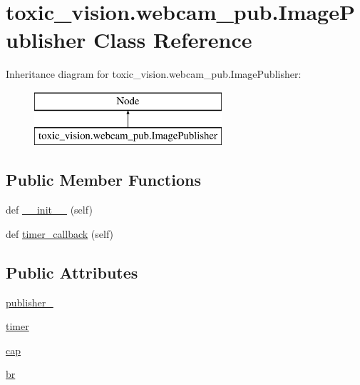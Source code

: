 \hypertarget{classtoxic__vision_1_1webcam__pub_1_1ImagePublisher}{}\section{toxic\+\_\+vision.\+webcam\+\_\+pub.\+Image\+Publisher Class Reference}
\label{classtoxic__vision_1_1webcam__pub_1_1ImagePublisher}
Inheritance diagram for toxic\+\_\+vision.\+webcam\+\_\+pub.\+Image\+Publisher\+:\begin{figure}[H]
\begin{center}
\leavevmode
\includegraphics[height=2.000000cm]{d2/da6/classtoxic__vision_1_1webcam__pub_1_1ImagePublisher}
\end{center}
\end{figure}
\subsection*{Public Member Functions}
\begin{DoxyCompactItemize}
\item 
def \mbox{\hyperlink{classtoxic__vision_1_1webcam__pub_1_1ImagePublisher_a93ec3d951e9aa3a3be5bd1b466027f45}{\+\_\+\+\_\+init\+\_\+\+\_\+}} (self)
\item 
def \mbox{\hyperlink{classtoxic__vision_1_1webcam__pub_1_1ImagePublisher_a6e41491a3257eac8e8fa3c47eac9c04d}{timer\+\_\+callback}} (self)
\end{DoxyCompactItemize}
\subsection*{Public Attributes}
\begin{DoxyCompactItemize}
\item 
\mbox{\hyperlink{classtoxic__vision_1_1webcam__pub_1_1ImagePublisher_a34e6179507877abfe947cbe448f184eb}{publisher\+\_\+}}
\item 
\mbox{\hyperlink{classtoxic__vision_1_1webcam__pub_1_1ImagePublisher_a278015e0d7ea896193603a3ad5400b56}{timer}}
\item 
\mbox{\hyperlink{classtoxic__vision_1_1webcam__pub_1_1ImagePublisher_aa33fab3b1d7089dfc849b765bba7d194}{cap}}
\item 
\mbox{\hyperlink{classtoxic__vision_1_1webcam__pub_1_1ImagePublisher_a370d3c79435256163a600004bc744498}{br}}
\end{DoxyCompactItemize}


